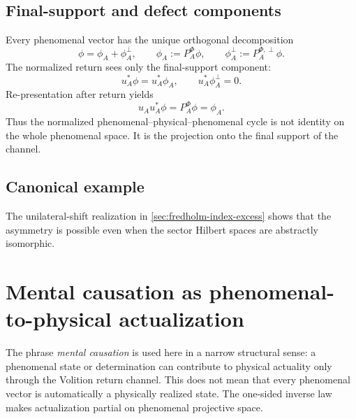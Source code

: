 \documentclass[11pt,reqno]{scrartcl}
\newcommand{\polA}{u_A}
\newcommand{\suppProjF}{P_{A}^{\Phi}}
\newcommand{\defectProjF}{P_{A}^{\Phi,\perp}}
\theoremstyle{plain}
\theoremstyle{definition}
\theoremstyle{remark}
\begin{document}
\subsection{Final-support and defect components}

Every phenomenal vector has the unique orthogonal decomposition
\begin{equation}
  \boxed{
  \phi=\phi_A+\phi_A^{\perp},
  \qquad
  \phi_A:=\suppProjF\phi,
  \qquad
  \phi_A^{\perp}:=\defectProjF\phi.}
  \label{eq:phenomenal-rep-exc-decomp}
\end{equation}
The normalized return sees only the final-support component:
\begin{equation}
  \boxed{
  \polA^*\phi
  =\polA^*\phi_A,
  \qquad
  \polA^*\phi_A^{\perp}=0.}
  \label{eq:return-sees-representable}
\end{equation}
Re-presentation after return yields
\begin{equation}
  \polA\polA^*\phi=\suppProjF\phi=\phi_A.
  \label{eq:phen-return-cycle-projection}
\end{equation}
Thus the normalized phenomenal--physical--phenomenal cycle is not identity on
the whole phenomenal space.  It is the projection onto the final support of
the channel.

\subsection{Canonical example}

The unilateral-shift realization in \cref{sec:fredholm-index-excess} shows
that the asymmetry is possible even when the sector Hilbert spaces are
abstractly isomorphic.
\section{Mental causation as phenomenal-to-physical actualization}
\label{sec:mental-causation-actualization}

The phrase \emph{mental causation} is used here in a narrow structural sense:
a phenomenal state or determination can contribute to physical actuality
only through the Volition return channel.  This does not mean that every
phenomenal vector is automatically a physically realized state.  The
one-sided inverse law makes actualization partial on phenomenal projective
space.
\end{document}
